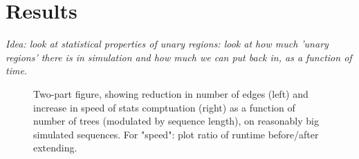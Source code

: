 \documentclass[10pt,twoside,lineno]{gsajnl}
\newcommand{\comment}[1]{{\color{blue} \it #1}}
\begin{document}
% 
% 
% 
% 
% 
% 


\section{Results}

\comment{
    Idea: look at statistical properties of unary regions:
    look at how much 'unary regions' there is in simulation
    and how much we can put back in,
    as a function of time.
}


\begin{figure}
    \caption{
        Two-part figure, showing reduction in number of edges (left) and increase in speed of stats comptuation (right)
        as a function of number of trees (modulated by sequence length),
        on reasonably big simulated sequences.
        For "speed": plot ratio of runtime before/after extending.
        \label{fig:speed_and_edges}
    }
\end{figure}
\end{document}
